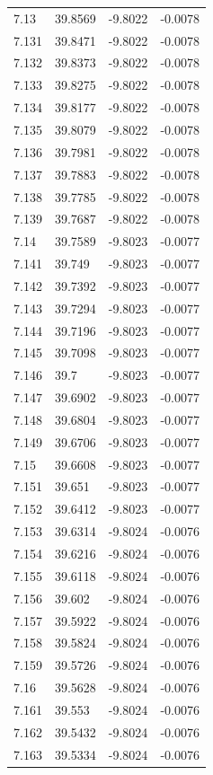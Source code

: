 \begin{tabular}{llll}
7.13 & 39.8569 & -9.8022 & -0.0078 \\
7.131 & 39.8471 & -9.8022 & -0.0078 \\
7.132 & 39.8373 & -9.8022 & -0.0078 \\
7.133 & 39.8275 & -9.8022 & -0.0078 \\
7.134 & 39.8177 & -9.8022 & -0.0078 \\
7.135 & 39.8079 & -9.8022 & -0.0078 \\
7.136 & 39.7981 & -9.8022 & -0.0078 \\
7.137 & 39.7883 & -9.8022 & -0.0078 \\
7.138 & 39.7785 & -9.8022 & -0.0078 \\
7.139 & 39.7687 & -9.8022 & -0.0078 \\
7.14 & 39.7589 & -9.8023 & -0.0077 \\
7.141 & 39.749 & -9.8023 & -0.0077 \\
7.142 & 39.7392 & -9.8023 & -0.0077 \\
7.143 & 39.7294 & -9.8023 & -0.0077 \\
7.144 & 39.7196 & -9.8023 & -0.0077 \\
7.145 & 39.7098 & -9.8023 & -0.0077 \\
7.146 & 39.7 & -9.8023 & -0.0077 \\
7.147 & 39.6902 & -9.8023 & -0.0077 \\
7.148 & 39.6804 & -9.8023 & -0.0077 \\
7.149 & 39.6706 & -9.8023 & -0.0077 \\
7.15 & 39.6608 & -9.8023 & -0.0077 \\
7.151 & 39.651 & -9.8023 & -0.0077 \\
7.152 & 39.6412 & -9.8023 & -0.0077 \\
7.153 & 39.6314 & -9.8024 & -0.0076 \\
7.154 & 39.6216 & -9.8024 & -0.0076 \\
7.155 & 39.6118 & -9.8024 & -0.0076 \\
7.156 & 39.602 & -9.8024 & -0.0076 \\
7.157 & 39.5922 & -9.8024 & -0.0076 \\
7.158 & 39.5824 & -9.8024 & -0.0076 \\
7.159 & 39.5726 & -9.8024 & -0.0076 \\
7.16 & 39.5628 & -9.8024 & -0.0076 \\
7.161 & 39.553 & -9.8024 & -0.0076 \\
7.162 & 39.5432 & -9.8024 & -0.0076 \\
7.163 & 39.5334 & -9.8024 & -0.0076 \\

\end{tabular}
